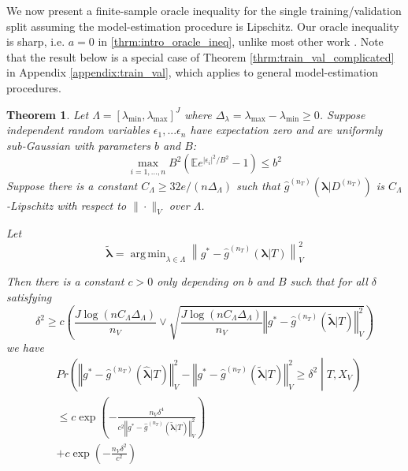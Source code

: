 \documentclass[12pt]{article}
\newtheorem{theorem}{Theorem}
\DeclareMathOperator*{\argmin}{arg\,min}
\begin{document}
We now present a finite-sample oracle inequality for the single training/validation split assuming the model-estimation procedure is Lipschitz. Our oracle inequality is sharp, i.e. $a=0$ in \eqref{thrm:intro_oracle_ineq}, unlike most other work \citep{gyorfi2006distribution, lecue2012oracle, van2003unified}. Note that the result below is a special case of Theorem \ref{thrm:train_val_complicated} in Appendix \ref{appendix:train_val}, which applies to general model-estimation procedures.
\begin{theorem}
	\label{thrm:train_val}
	Let $\Lambda=[\lambda_{\min},\lambda_{\max}]^{J}$ where $\Delta_{\lambda} = \lambda_{\max} - \lambda_{\min} \ge 0$. Suppose independent random variables $\epsilon_1, ... \epsilon_n$ have expectation zero and are uniformly sub-Gaussian with parameters $b$ and $B$:
	$$
	\max_{i=1,...,n} B^2 \left ( \mathbb{E} e^{|\epsilon_i|^2/B^2} - 1 \right ) \le b^2
	$$
	Suppose there is a constant $C_\Lambda \ge 32e/(n \Delta_{\Lambda})$ such that $\hat g^{(n_T)}(\boldsymbol{\lambda} |D^{(n_T)})$ is $C_\Lambda$-Lipschitz with respect to $\| \cdot \|_V$ over $\Lambda$.
	
	Let 
	\begin{equation}
	\tilde{\boldsymbol \lambda} = \argmin_{\lambda \in \Lambda} \left \| g^*-\hat{g}^{(n_T)}( \boldsymbol{\lambda} | T) \right \|_{V}^{2}
	\label{eq:tilde_lambda_def}
	\end{equation}
	
	Then there is a constant $c>0$ only depending on $b$ and $B$ such that for all $\delta$ satisfying
	\begin{equation}
	\delta^{2}
	\ge
	c \left ( 
	\frac{J\log (n C_\Lambda \Delta_{\Lambda})}{n_{V}}
	\vee 
	\sqrt{\frac{J \log (n C_\Lambda \Delta_{\Lambda})}{n_{V}}\left\Vert g^* - \hat{g}^{(n_T)}( \tilde{\boldsymbol{\lambda}} | T)\right\Vert_{V}^2}
	\right )
	\label{thrm:train_val_delta}
	\end{equation}
	we have
	\begin{align}
	& Pr\left(
	\left\Vert g^* - \hat{g}^{(n_T)}( \hat{\boldsymbol{\lambda}} | T) \right\Vert _{V}^2 -
	\left\Vert g^* - \hat{g}^{(n_T)}( \tilde{\boldsymbol{\lambda}} | T) \right\Vert _{V}^2
	\ge\delta^2
	\middle | 
	T, X_V
	\right )\\
	&\le c\exp\left(-\frac{n_{V}\delta^{4}}{
		c^{2}
		\left\Vert g^* - \hat{g}^{(n_T)}( \tilde{\boldsymbol{\lambda}} | T) \right\Vert _{V}^2
	}\right) \\
	& +c\exp\left(-\frac{n_{V}\delta^{2}}{c^{2}}\right)
	\end{align}
	
\end{theorem}
\end{document}
